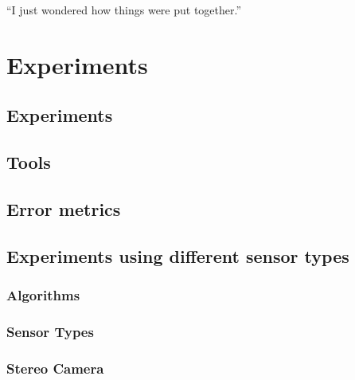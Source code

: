 \begin{savequote}[8cm]
  ``I just wondered how things were put together.''
\end{savequote}
\makeatletter
\chapter{Experiments}
\label{ch:Experiments}

\section{Experiments}



%

\section{Tools}
\label{ToolsSection}


\section{Error metrics}
\label{metricsSection}


\section{Experiments using different sensor types}
\label{Sec:FVRSOTA}
\subsection{Algorithms} 
\label{AlgorithmsSection}


\subsection{Sensor Types} 
\label{SensorTypesExpsSection}


\subsection{Stereo Camera}
\label{StereoSOTA}


